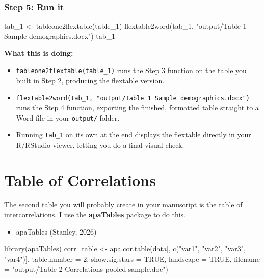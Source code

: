 \documentclass[
  letterpaper,
  DIV=11,
  numbers=noendperiod]{scrreprt}
\newenvironment{Shaded}{\begin{snugshade}}{\end{snugshade}}
\newcommand{\AttributeTok}[1]{\textcolor[rgb]{0.40,0.45,0.13}{#1}}
\newcommand{\ConstantTok}[1]{\textcolor[rgb]{0.56,0.35,0.01}{#1}}
\newcommand{\DecValTok}[1]{\textcolor[rgb]{0.68,0.00,0.00}{#1}}
\newcommand{\FunctionTok}[1]{\textcolor[rgb]{0.28,0.35,0.67}{#1}}
\newcommand{\NormalTok}[1]{\textcolor[rgb]{0.00,0.23,0.31}{#1}}
\newcommand{\OtherTok}[1]{\textcolor[rgb]{0.00,0.23,0.31}{#1}}
\newcommand{\StringTok}[1]{\textcolor[rgb]{0.13,0.47,0.30}{#1}}
\providecommand{\tightlist}{%
  \setlength{\itemsep}{0pt}\setlength{\parskip}{0pt}}\usepackage{longtable,booktabs,array}
\begin{document}
\subsection{Step 5: Run it}\label{step-5-run-it}

\begin{Shaded}
\begin{Highlighting}[]
\NormalTok{tab\_1 }\OtherTok{\textless{}{-}} \FunctionTok{tableone2flextable}\NormalTok{(table\_1)    }\FunctionTok{flextable2word}\NormalTok{(tab\_1, }\StringTok{"output/Table 1 Sample demographics.docx"}\NormalTok{)  tab\_1}
\end{Highlighting}
\end{Shaded}

\textbf{What this is doing:}

\begin{itemize}
\item
  \texttt{tableone2flextable(table\_1)} runs the Step 3 function on the
  table you built in Step 2, producing the flextable version.
\item
  \texttt{flextable2word(tab\_1,\ "output/Table\ 1\ Sample\ demographics.docx")}
  runs the Step 4 function, exporting the finished, formatted table
  straight to a Word file in your \texttt{output/} folder.
\item
  Running \texttt{tab\_1} on its own at the end displays the flextable
  directly in your R/RStudio viewer, letting you do a final visual
  check.
\end{itemize}

\chapter{Table of Correlations}\label{table-of-correlations}

The second table you will probably create in your manuscript is the
table of intercorrelations. I use the \textbf{apaTables} package to do
this.

\begin{itemize}
\tightlist
\item
  apaTables (Stanley, 2026)
\end{itemize}

\begin{Shaded}
\begin{Highlighting}[]
\FunctionTok{library}\NormalTok{(apaTables)}
\NormalTok{corr\_table }\OtherTok{\textless{}{-}} \FunctionTok{apa.cor.table}\NormalTok{(data[, }\FunctionTok{c}\NormalTok{(}\StringTok{"var1"}\NormalTok{, }\StringTok{"var2"}\NormalTok{, }\StringTok{"var3"}\NormalTok{, }\StringTok{"var4"}\NormalTok{)], }
                        \AttributeTok{table.number =} \DecValTok{2}\NormalTok{, }
                        \AttributeTok{show.sig.stars =} \ConstantTok{TRUE}\NormalTok{, }
                        \AttributeTok{landscape =} \ConstantTok{TRUE}\NormalTok{,}
                        \AttributeTok{filename =} \StringTok{"output/Table 2 Correlations pooled sample.doc"}\NormalTok{)}
\end{Highlighting}
\end{Shaded}
\end{document}
